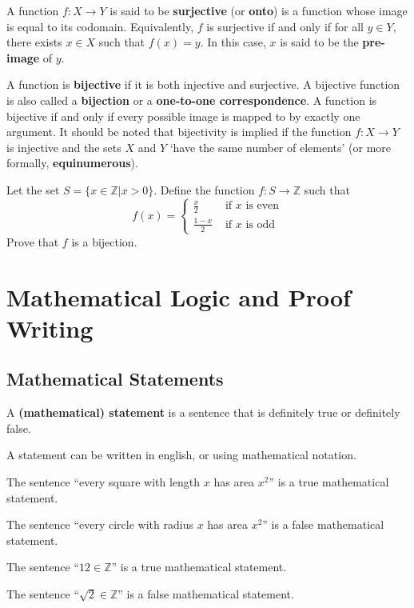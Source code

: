 A function $f: X \to Y$ is said to be \textbf{surjective} (or \textbf{onto}) is a function whose image is equal to its codomain. Equivalently, $f$ is surjective if and only if for all $y \in Y$, there exists $x \in X$ such that $f(x) = y$. In this case, $x$ is said to be the \textbf{pre-image} of $y$.

A function is \textbf{bijective} if it is both injective and surjective. A bijective function is also called a \textbf{bijection} or a \textbf{one-to-one correspondence}. A function is bijective if and only if every possible image is mapped to by exactly one argument. It should be noted that bijectivity is implied if the function $f: X \to Y$ is injective and the sets $X$ and $Y$ `have the same number of elements' (or more formally, \textbf{equinumerous}).

\begin{exercise}
    Let the set $S = \{x \in \mathbb{Z} \vert x > 0\}$. Define the function $f: S \to \mathbb{Z}$ such that
    \[
        f(x) = \begin{cases}
            \frac{x}{2} & \text{ if } x \text{ is even}\\
            \frac{1-x}{2} & \text{ if } x \text{ is odd} 
        \end{cases}
    \]
    Prove that $f$ is a bijection.
\end{exercise}

\chapter{Mathematical Logic and Proof Writing}
\section{Mathematical Statements}
\begin{definition}
    A \textbf{(mathematical) statement} is a sentence that is definitely true or definitely false.
\end{definition}
\begin{remark}
    A statement can be written in english, or using mathematical notation.
\end{remark}
\begin{example}
    The sentence ``every square with length $x$ has area $x^2$'' is a true mathematical statement.
\end{example}
\begin{example}
    The sentence ``every circle with radius $x$ has area $x^2$'' is a false mathematical statement.
\end{example}
\begin{example}
    The sentence ``$12 \in \mathbb{Z}$'' is a true mathematical statement.
\end{example}
\begin{example}
    The sentence ``$\sqrt2 \in \mathbb{Z}$'' is a false mathematical statement.
\end{example}


